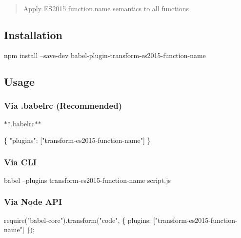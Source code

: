 \begin{quote}
Apply E\+S2015 function.\+name semantics to all functions \end{quote}


\subsection*{Installation}


\begin{DoxyCode}
npm install --save-dev babel-plugin-transform-es2015-function-name
\end{DoxyCode}


\subsection*{Usage}

\subsubsection*{Via {\ttfamily .babelrc} (Recommended)}

$\ast$$\ast$.babelrc$\ast$$\ast$


\begin{DoxyCode}
\{
  "plugins": ["transform-es2015-function-name"]
\}
\end{DoxyCode}


\subsubsection*{Via C\+LI}


\begin{DoxyCode}
babel --plugins transform-es2015-function-name script.js
\end{DoxyCode}


\subsubsection*{Via Node A\+PI}


\begin{DoxyCode}
require("babel-core").transform("code", \{
  plugins: ["transform-es2015-function-name"]
\});
\end{DoxyCode}
 